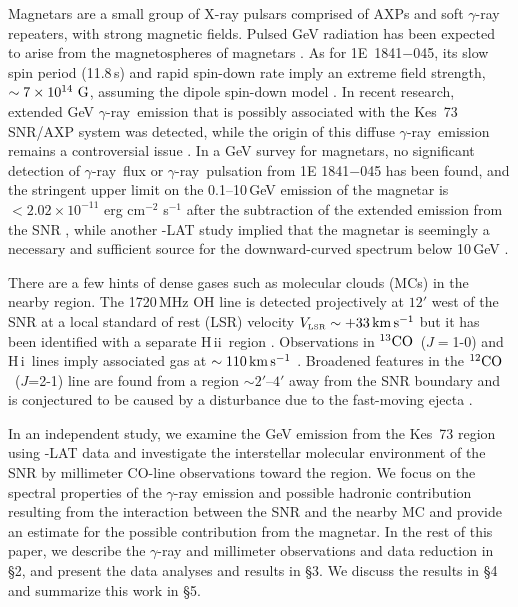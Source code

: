\documentclass[12pt,preprint]{aastex}
\newcommand{\ssst}{\scriptscriptstyle}
\newcommand{\VLSR}{V_{\ssst\rm LSR}}
\newcommand{\twCO}{$^{12}{\rm CO}$}
\newcommand{\thCO}{$^{13}{\rm CO}$}
\newcommand{\Jtto}{$J$=2-1}
\newcommand{\gray}{{\rm $\gamma$-ray}}
\begin{document}
Magnetars are a small group of X-ray pulsars %
comprised of AXPs and soft $\gamma$-ray repeaters,
with strong magnetic fields.
Pulsed GeV radiation has been expected to arise from the magnetospheres of magnetars
\citep[e.g.,][]{Cheng2001mag, Beloborodov2007mag, Takata2013mag}. 
As for 1E~1841$-$045, its slow spin period (11.8\,s)
 and rapid spin-down rate imply an extreme field strength,
$\sim 7\times 10^{14}\ \rm G$,
assuming the dipole spin-down model
\citep{Hongjun2013}.
%
In recent research,  
extended GeV \gray\ emission  %
that is possibly associated with the Kes~73 SNR/AXP system was detected,
while the origin of  this diffuse \gray\ emission
remains a controversial issue \citep{1fsnr,Lijian2017magnetar,Yeung2017kes73}. 
In a GeV survey for magnetars, 
no significant detection of  \gray\ flux or \gray\ 
pulsation from 1E 1841$-$045  has been found, 
and the stringent upper limit on the 0.1--10\,GeV emission of  
the magnetar  is $<2.02\times10^{-11}$ erg cm$^{-2}$ s$^{-1}$
after the subtraction of the extended emission from the SNR
\citep{Lijian2017magnetar},
while another \Fermi-LAT study implied that the magnetar is seemingly 
a necessary and sufficient source for the downward-curved spectrum below 10\,GeV
\citep{Yeung2017kes73}.

There are a few hints of dense gases such as molecular clouds (MCs)
in the nearby region.
The 1720\,MHz OH line is detected projectively at $12'$ west of the SNR
at a local standard of rest (LSR) velocity $\VLSR\sim+33\km\ps$
\citep{Green1997}
but  it has been identified with a separate H\,{\sc ii}~region
\citep{Helfand1992}.
Observations in \thCO\ ($J=$1-0) and H\,{\sc i}~lines imply associated
gas at $\sim110\,{\rm km}\,{\rm s}^{-1}$ \citep{Tian2008kes73}.
Broadened  features in the  \twCO\ (\Jtto) line  are found from
a  region $\sim2'$--$4'$ away from the SNR boundary and
is conjectured to be caused  by  a disturbance due to the fast-moving
ejecta \citep{Kilpatrick2016co}.


In an independent study, we examine the GeV emission from the Kes~73 region
using \Fermi-LAT data and investigate the interstellar 
molecular environment of the SNR by millimeter CO-line observations toward the region.
We focus on the spectral properties of the $\gamma$-ray emission and
possible hadronic contribution  resulting from the interaction 
between the SNR and the nearby  MC and 
  provide an estimate for the possible contribution from the magnetar.
In the rest of this paper, we describe the $\gamma$-ray and millimeter
observations and data reduction in \S2,
 and present the data analyses and results in \S3.
We discuss the results in \S4 and summarize this work in \S5.
\end{document}
